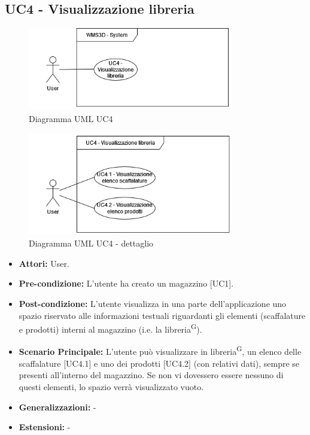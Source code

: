 \subsection{UC4 - Visualizzazione libreria}
\begin{figure}[H]
  \centering
  \includegraphics[width=0.8\textwidth]{UC_diagrams_1-10/UC4_sys.drawio.png}
   \caption{Diagramma UML UC4}
\end{figure}
\begin{figure}[H]
  \centering
  \includegraphics[width=0.8\textwidth]{UC_diagrams_1-10/UC4.drawio.png}
   \caption{Diagramma UML UC4 - dettaglio}
\end{figure}
\begin{itemize}
    \item \textbf{Attori:} User.
    \item \textbf{Pre-condizione:}  L'utente ha creato un magazzino [UC1].
    \item \textbf{Post-condizione:} L'utente visualizza in una parte dell'applicazione uno spazio riservato alle informazioni testuali riguardanti gli elementi (scaffalature e prodotti) interni al magazzino (i.e. la libreria\textsuperscript{G}).
    \item \textbf{Scenario Principale:}  L'utente può visualizzare in libreria\textsuperscript{G}, un elenco delle scaffalature [UC4.1] e uno dei prodotti [UC4.2] (con relativi dati), sempre se presenti all'interno del magazzino. Se non vi dovessero essere nessuno di questi elementi, lo spazio verrà visualizzato vuoto.
    \item \textbf{Generalizzazioni:} -
    \item \textbf{Estensioni:} -
\end{itemize}


